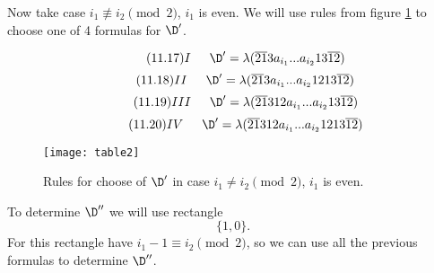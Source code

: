 Now take case $i_1 \not\equiv i_2 \pmod 2$, $i_1$ is even. We will use rules from figure \ref{table2} to choose one of 4 formulas for $\D'$.

\begin{equation}\tag{11.17}
	I \hspace{15pt}
	\D' = \lambda(\overline{21}3a_{i_1}... a_{i_2}13\overline{12})
\end{equation}
\begin{equation}\tag{11.18}
	II \hspace{15pt}
	\D' = \lambda(\overline{21}3a_{i_1}... a_{i_2}1213\overline{12})
\end{equation}
\begin{equation}\tag{11.19}
	III \hspace{15pt}
	\D' = \lambda(\overline{21}312a_{i_1}... a_{i_2}13\overline{12})
\end{equation}
\begin{equation}\tag{11.20}
	IV \hspace{15pt}
	\D' = \lambda(\overline{21}312a_{i_1}... a_{i_2}1213\overline{12})
\end{equation}

\begin{figure}[ht]
	\centering
	\texttt{[image: table2]}
	\caption{Rules for choose of $\D'$ in case $i_1 \ne i_2 \pmod 2$, $i_1$ is even.}
	\label{table2}
\end{figure}

To determine $\D''$ we will use rectangle
$$\{1, 0\}.$$
For this rectangle have $i_1 - 1 \equiv i_2 \pmod 2$, so we can use all the previous formulas to determine $\D''$.
